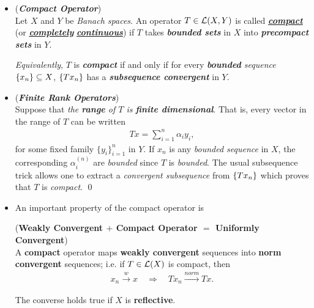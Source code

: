 \documentclass[11pt]{article}
\begin{document}
\begin{itemize}
\item \begin{definition} (\emph{\textbf{Compact Operator}})\\
Let $X$ and $Y$ be \emph{Banach spaces}. An operator $T \in {\mathcal L}(X, Y)$ is called \underline{\emph{\textbf{compact}}} (or \underline{\emph{\textbf{completely}}} \underline{\emph{\textbf{continuous}}}) if $T$ takes \emph{\textbf{bounded sets}} in $X$ into \emph{\textbf{precompact sets}} in $Y$. 

\emph{Equivalently}, $T$ is \emph{\textbf{compact}} if and only if for every \emph{\textbf{bounded} sequence} $\left\{x_n\right\} \subseteq X$, $\left\{T x_n\right\}$ has a \emph{\textbf{subsequence convergent}} in $Y$. 
\end{definition}

\item \begin{example} (\emph{\textbf{Finite Rank Operators}}) \\
Suppose that \emph{the \textbf{range} of $T$ is \textbf{finite  dimensional}}. That is, every vector in the range of $T$ can be written 
\begin{align*}
T x = \sum_{i=1}^{n}\alpha_i y_i,
\end{align*} for some fixed family $\{y_i\}_{i=1}^{n}$ in $Y$. If $x_n$ is any \emph{bounded sequence} in $X$, the corresponding $\alpha_i^{(n)}$ are \emph{bounded} since $T$ is \emph{bounded}. The usual subsequence trick allows one to extract a \emph{convergent subsequence} from $\left\{T x_n\right\}$ which proves that $T$ is \emph{compact}. \qed
\end{example}

\item An important property of the compact operator is 
\begin{theorem} (\textbf{Weakly Convergent $+$ Compact Operator $=$ Uniformly Convergent}) \citep{reed1980methods}\\
A \textbf{compact} operator maps \textbf{weakly convergent} sequences into \textbf{norm convergent} sequences; i.e. if $T \in {\mathcal L}(X)$ is compact, then
\begin{align*}
x_n \stackrel{w}{\rightarrow} x \quad \Rightarrow \quad Tx_{n} \stackrel{norm}{\rightarrow} Tx.
\end{align*}

The converse holds true if $X$ is \textbf{reflective}.
\end{theorem}


\end{itemize}
\end{document}
